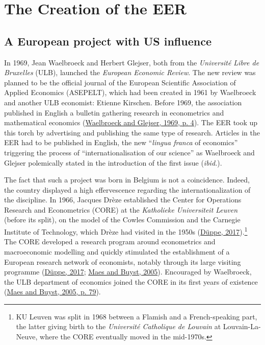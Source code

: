 \documentclass[]{elsarticle} %
\begin{document}
\hypertarget{EER-creation}{%
\section{The Creation of the EER}\label{EER-creation}}

\hypertarget{a-european-project-with-us-influence}{%
\subsection{A European project with US
influence}\label{a-european-project-with-us-influence}}

In 1969, Jean Waelbroeck and Herbert Glejser, both from the
\emph{Université Libre de Bruxelles} (ULB), launched the \emph{European
Economic Review}. The new review was planned to be the official journal
of the European Scientific Association of Applied Economics (ASEPELT),
which had been created in 1961 by Waelbroeck and another ULB economist:
Etienne Kirschen. Before 1969, the association published in English a
bulletin gathering research in econometrics and mathematical economics
(\protect\hyperlink{ref-waelbroeck1969}{Waelbroeck and Glejser, 1969, p.
4}). The EER took up this torch by advertising and publishing the same
type of research. Articles in the EER had to be published in English,
the new ``\emph{lingua franca} of economics'' triggering the process of
``internationalisation of our science'' as Waelbroeck and Glejser
polemically stated in the introduction of the first issue
(\emph{ibid.}).

The fact that such a project was born in Belgium is not a coincidence.
Indeed, the country displayed a high effervescence regarding the
internationalization of the discipline. In 1966, Jacques Drèze
established the Center for Operations Research and Econometrics (CORE)
at the \emph{Katholieke Universiteit Leuven} (before its split), on the
model of the Cowles Commission and the Carnegie Institute of Technology,
which Drèze had visited in the 1950s
(\protect\hyperlink{ref-duppe2017}{Düppe, 2017}).\footnote{KU Leuven was
  split in 1968 between a Flamish and a French-speaking part, the latter
  giving birth to the \emph{Université Catholique de Louvain} at
  Louvain-La-Neuve, where the CORE eventually moved in the mid-1970s.}
The CORE developed a research program around econometrics and
macroeconomic modelling and quickly stimulated the establishment of a
European research network of economists, notably through its large
visiting programme (\protect\hyperlink{ref-duppe2017}{Düppe, 2017};
\protect\hyperlink{ref-maes2005}{Maes and Buyst, 2005}). Encouraged by
Waelbroeck, the ULB department of economics joined the CORE in its first
years of existence (\protect\hyperlink{ref-maes2005}{Maes and Buyst,
2005, p. 79}).
\end{document}
